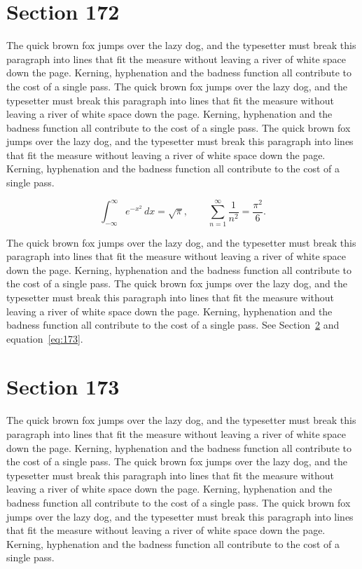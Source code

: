 \documentclass{article}
\begin{document}
\section{Section 172}
\label{sec:172}
The quick brown fox jumps over the lazy dog, and the typesetter must break this paragraph into lines that fit the measure without leaving a river of white space down the page. Kerning, hyphenation and the badness function all contribute to the cost of a single pass. The quick brown fox jumps over the lazy dog, and the typesetter must break this paragraph into lines that fit the measure without leaving a river of white space down the page. Kerning, hyphenation and the badness function all contribute to the cost of a single pass. The quick brown fox jumps over the lazy dog, and the typesetter must break this paragraph into lines that fit the measure without leaving a river of white space down the page. Kerning, hyphenation and the badness function all contribute to the cost of a single pass. 

\begin{equation}\label{eq:172}
\int_{-\infty}^{\infty} e^{-x^{2}}\,dx = \sqrt{\pi}, \qquad
\sum_{n=1}^{\infty} \frac{1}{n^{2}} = \frac{\pi^{2}}{6}.
\end{equation}

The quick brown fox jumps over the lazy dog, and the typesetter must break this paragraph into lines that fit the measure without leaving a river of white space down the page. Kerning, hyphenation and the badness function all contribute to the cost of a single pass. The quick brown fox jumps over the lazy dog, and the typesetter must break this paragraph into lines that fit the measure without leaving a river of white space down the page. Kerning, hyphenation and the badness function all contribute to the cost of a single pass. 
See Section~\ref{sec:173} and equation~\eqref{eq:173}.
\section{Section 173}
\label{sec:173}
The quick brown fox jumps over the lazy dog, and the typesetter must break this paragraph into lines that fit the measure without leaving a river of white space down the page. Kerning, hyphenation and the badness function all contribute to the cost of a single pass. The quick brown fox jumps over the lazy dog, and the typesetter must break this paragraph into lines that fit the measure without leaving a river of white space down the page. Kerning, hyphenation and the badness function all contribute to the cost of a single pass. The quick brown fox jumps over the lazy dog, and the typesetter must break this paragraph into lines that fit the measure without leaving a river of white space down the page. Kerning, hyphenation and the badness function all contribute to the cost of a single pass. 
\end{document}
